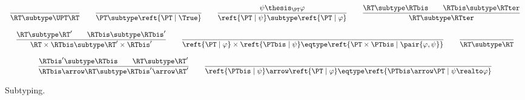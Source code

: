 \begin{figure}[t!]
\[
\begin{array}{c}

\dfrac{}
  {\RT \subtype \UPT\RT}

\qquad

\dfrac{}
  {\PT \subtype \reft{\PT \mid \True}}

\qquad

\dfrac{\psi \thesis_{\PT} \varphi}
  {\reft{\PT \mid \psi} \subtype \reft{\PT \mid \varphi}}

\qquad

\dfrac{\RT \subtype \RTbis
  \qquad
  \RTbis \subtype \RTter}
  {\RT \subtype \RTter}

\\\\

\dfrac{\RT \subtype \RT'
  \qquad
  \RTbis \subtype \RTbis'}
  {\RT \times \RTbis \subtype \RT' \times \RTbis'}

\qquad

\dfrac{}{
  \reft{\PT \mid \varphi}
  \times
  \reft{\PTbis \mid \psi}
  \eqtype
  \reft{\PT \times \PTbis \mid \pair{\varphi,\psi}}}

\qquad

\dfrac{}
  {\RT \subtype \RT}

\\\\

\dfrac{\RTbis' \subtype \RTbis
  \qquad
  \RT \subtype \RT'}
  {\RTbis \arrow \RT \subtype \RTbis' \arrow \RT'}


\qquad

\dfrac{}
  {\reft{\PTbis \mid \psi} \arrow \reft{\PT \mid \varphi}
  \eqtype
  \reft{\PTbis \arrow \PT \mid \psi \realto \varphi}}

\end{array}
\]

\caption{Subtyping.%
\label{fig:reft:subtyping}}
\end{figure}


